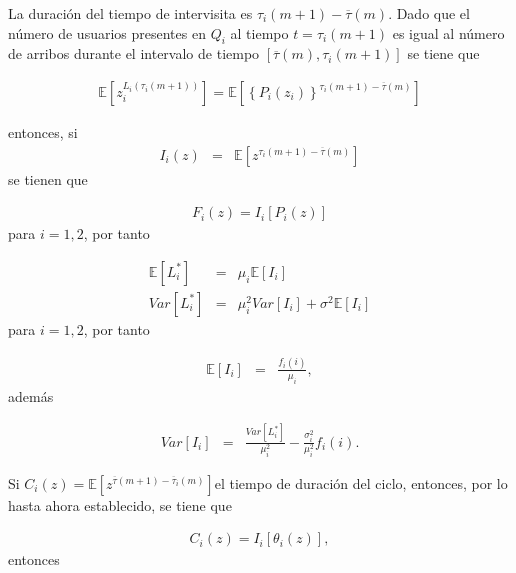 \documentclass{article}
\newcommand{\esp}{\mathbb{E}}
\begin{document}
La duraci\'on del tiempo de intervisita es $\tau_{i}\left(m+1\right)-\overline{\tau}\left(m\right)$. Dado que el n\'umero de usuarios presentes en $Q_{i}$ al tiempo $t=\tau_{i}\left(m+1\right)$ es igual al n\'umero de arribos durante el intervalo de tiempo $\left[\overline{\tau}\left(m\right),\tau_{i}\left(m+1\right)\right]$ se tiene que


\begin{eqnarray*}
\esp\left[z_{i}^{L_{i}\left(\tau_{i}\left(m+1\right)\right)}\right]=\esp\left[\left\{P_{i}\left(z_{i}\right)\right\}^{\tau_{i}\left(m+1\right)-\overline{\tau}\left(m\right)}\right]
\end{eqnarray*}

entonces, si \begin{eqnarray*}I_{i}\left(z\right)&=&\esp\left[z^{\tau_{i}\left(m+1\right)-\overline{\tau}\left(m\right)}\right]\end{eqnarray*} se tienen que

\begin{eqnarray*}
F_{i}\left(z\right)=I_{i}\left[P_{i}\left(z\right)\right]
\end{eqnarray*}
para $i=1,2$, por tanto



\begin{eqnarray*}
\esp\left[L_{i}^{*}\right]&=&\mu_{i}\esp\left[I_{i}\right]\\
Var\left[L_{i}^{*}\right]&=&\mu_{i}^{2}Var\left[I_{i}\right]+\sigma^{2}\esp\left[I_{i}\right]
\end{eqnarray*}
para $i=1,2$, por tanto


\begin{eqnarray*}
\esp\left[I_{i}\right]&=&\frac{f_{i}\left(i\right)}{\mu_{i}},
\end{eqnarray*}
adem\'as

\begin{eqnarray*}
Var\left[I_{i}\right]&=&\frac{Var\left[L_{i}^{*}\right]}{\mu_{i}^{2}}-\frac{\sigma_{i}^{2}}{\mu_{i}^{2}}f_{i}\left(i\right).
\end{eqnarray*}


Si  $C_{i}\left(z\right)=\esp\left[z^{\overline{\tau}\left(m+1\right)-\overline{\tau}_{i}\left(m\right)}\right]$el tiempo de duraci\'on del ciclo, entonces, por lo hasta ahora establecido, se tiene que

\begin{eqnarray*}
C_{i}\left(z\right)=I_{i}\left[\theta_{i}\left(z\right)\right],
\end{eqnarray*}
entonces
\end{document}
